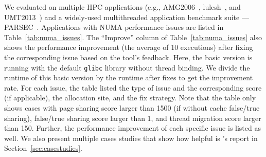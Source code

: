 We evaluated \NP{} on multiple HPC applications (e.g.,  AMG2006~\cite{AMG2006}, lulesh~\cite{LULESH}, and UMT2013~\cite{UMT2013}) and a widely-used multithreaded application benchmark suite --- PARSEC~\cite{parsec}.  Applications with NUMA performance issues are listed in Table~\ref{tab:numa_issues}. The ``Improve'' column of Table~\ref{tab:numa_issues} also shows the performance improvement (the average of 10 executions) after fixing the corresponding issue based on the tool's feedback. Here, the basic version is running with the default \texttt{glibc} library  without thread binding. We divide the runtime of this basic version by the runtime after fixes to get the improvement rate. For each issue, the table listed the type of issue and the corresponding score (if applicable), the allocation site, and the fix strategy. Note that the table only shows cases with page sharing score larger than 1500 (if without cache false/true sharing), false/true sharing score larger than 1, and thread migration score larger than 150. Further, the performance improvement of each specific issue is listed as well. We also present multiple cases studies that show how helpful is \NP{}'s report in Section~\ref{sec:casestudies}.   

